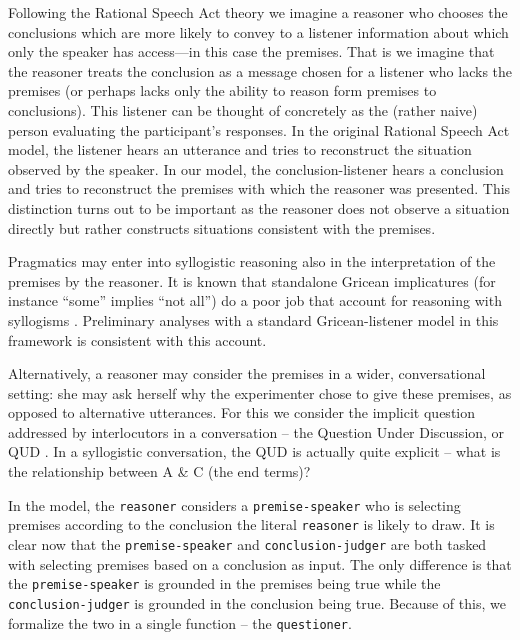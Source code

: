 \documentclass[10pt,letterpaper]{article}
\begin{document}
Following the Rational Speech Act theory \cite{Goodman2013,Frank2012a} we imagine a reasoner who chooses the conclusions which are more likely to convey to a listener information about which only the speaker has access---in this case the premises. That is we imagine that the reasoner treats the conclusion as a message chosen for a listener who lacks the premises (or perhaps lacks only the ability to reason form premises to conclusions).
This listener can be thought of concretely as the (rather naive) person evaluating the participant's responses. In the original Rational Speech Act model, the listener hears an utterance and tries to reconstruct the situation observed by the speaker. In our model, the conclusion-listener hears a conclusion and tries to reconstruct the premises with which the reasoner was presented. This distinction turns out to be important as the reasoner does not observe a situation directly but rather constructs situations consistent with the premises. 

Pragmatics may enter into syllogistic reasoning also in the interpretation of the premises by the reasoner. It is known that standalone Gricean implicatures (for instance ``some'' implies ``not all'') do a poor job that account for reasoning with syllogisms \cite{Roberts2001}. Preliminary analyses with a standard Gricean-listener model in this framework is consistent with this account. 

Alternatively, a reasoner may consider the premises in a wider, conversational setting: she may ask herself why the experimenter chose to give these premises, as opposed to alternative utterances. For this we consider the implicit question addressed by interlocutors in a conversation -- the Question Under Discussion, or QUD \cite{Roberts2004QUD}. In a syllogistic conversation, the QUD is actually quite explicit -- what is the relationship between A \& C (the end terms)?

In the model, the \lstinline{reasoner} considers a \lstinline{premise-speaker} who is selecting premises according to the conclusion the literal \lstinline{reasoner} is likely to draw. It is clear now that the \lstinline{premise-speaker} and \lstinline{conclusion-judger} are both tasked with selecting premises based on a conclusion as input. The only difference is that the \lstinline{premise-speaker} is grounded in the premises being true while the \lstinline{conclusion-judger} is grounded in the conclusion being true. Because of this, we formalize the two in a single function -- the \lstinline{questioner}.
\end{document}
